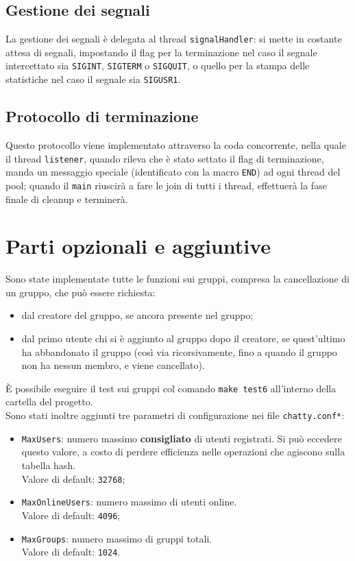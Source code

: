 \subsection{Gestione dei segnali}
La gestione dei segnali è delegata al thread \texttt{signalHandler}: si mette in costante attesa di segnali, impostando il flag per la terminazione nel caso il segnale intercettato sia \texttt{SIGINT}, \texttt{SIGTERM} o \texttt{SIGQUIT}, o quello per la stampa delle statistiche nel caso il segnale sia \texttt{SIGUSR1}.

\subsection{Protocollo di terminazione}
Questo protocollo viene implementato attraverso la coda concorrente, nella quale il thread \texttt{listener}, quando rileva che è stato settato il flag di terminazione, manda un messaggio speciale (identificato con la macro \texttt{END}) ad ogni thread del pool; quando il \texttt{main} riuscirà a fare le join di tutti i thread, effettuerà la fase finale di cleanup e terminerà.


\section{Parti opzionali e aggiuntive}
Sono state implementate tutte le funzioni sui gruppi, compresa la cancellazione di un gruppo, che può essere richiesta:
\begin{itemize}
	\item dal creatore del gruppo, se ancora presente nel gruppo;
	\item dal primo utente chi si è aggiunto al gruppo dopo il creatore, se quest'ultimo ha abbandonato il gruppo (così via ricorsivamente, fino a quando il gruppo non ha nessun membro, e viene cancellato).
\end{itemize}

È possibile eseguire il test sui gruppi col comando \texttt{make test6} all'interno della cartella del progetto.\\

Sono stati inoltre aggiunti tre parametri di configurazione nei file \texttt{chatty.conf*}:
\begin{itemize}
	\item \texttt{MaxUsers}: numero massimo \textbf{consigliato} di utenti registrati. Si può eccedere questo valore, a costo di perdere efficienza nelle operazioni che agiscono sulla tabella hash.\\
	Valore di default: \texttt{32768};
	\item \texttt{MaxOnlineUsers}: numero massimo di utenti online.\\
	Valore di default: \texttt{4096};
	\item \texttt{MaxGroups}: numero massimo di gruppi totali.\\
	Valore di default: \texttt{1024}.
\end{itemize}


